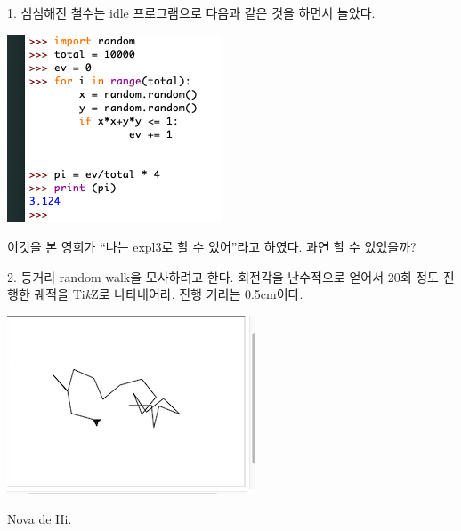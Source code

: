 \documentclass[a4paper,amsmath]{oblivoir}
\newcommand\tikzlogo{Ti\textit{k}Z}
\begin{document}
\begin{questionp}
 1. 심심해진 철수는 idle 프로그램으로 다음과 같은 것을 하면서 놀았다.

\includegraphics[scale=.9]{Screenshot-5-1}

이것을 본 영희가 “나는 expl3로 할 수 있어”라고 하였다. 과연 할 수 있었을까?

\bigskip

 2. 등거리 random walk을 모사하려고 한다. 회전각을 난수적으로 얻어서
20회 정도 진행한 궤적을 \tikzlogo 로 나타내어라. 진행 거리는 0.5cm이다.

\includegraphics[scale=.9]{Screenshot-5-2}

\end{questionp}



\vfill
\hfill Nova de Hi.
\end{document}
